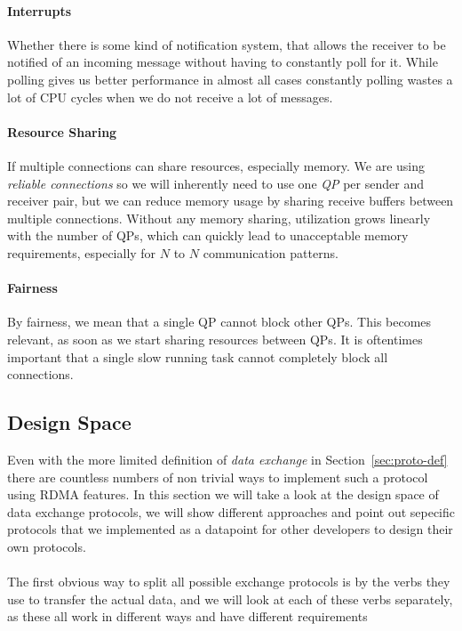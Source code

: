 \paragraph{Interrupts} Whether there is some kind of notification system, that allows the receiver to be notified 
of an incoming message without having to constantly poll for it. While polling gives us better performance in almost all cases
constantly polling wastes a lot of CPU cycles when we do not receive a lot of messages.

\paragraph{Resource Sharing} If multiple connections can share resources, especially memory. We are using \emph{reliable connections}
so we will inherently need to use one \emph{QP} per sender and receiver pair, but we can reduce memory usage by sharing receive 
buffers between multiple connections. Without any memory sharing, utilization grows linearly with the number of QPs, which 
can quickly lead to unacceptable memory requirements, especially for $N$ to $N$ communication patterns.

\paragraph{Fairness} By fairness, we mean that a single QP cannot block other QPs. This becomes relevant, as soon as we start
sharing resources between QPs. It is oftentimes important that a single slow running task cannot completely block all 
connections.




\subsection{Design Space} \label{sec:proto-ds}


Even with the more limited definition of \emph{data exchange} in Section~\ref{sec:proto-def} there are countless numbers
of non trivial ways to implement such a protocol using RDMA features. In this section we will take a look at the design 
space of data exchange protocols, we will show different approaches and point out sepecific protocols that we implemented
as a datapoint for other developers to design their own protocols.



\paragraph{} The first obvious way to split all possible exchange protocols is by the verbs they use to transfer the actual 
data, and we will look at each of these verbs separately, as these all work in different ways and have different requirements

